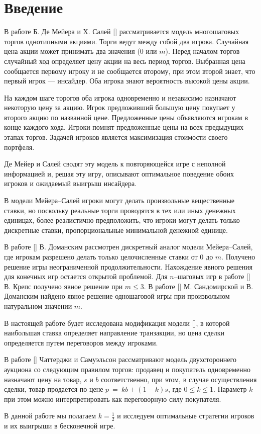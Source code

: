 \section{Введение}
В работе Б. Де Мейера и Х. Салей [\demeyer] рассматривается модель многошаговых торгов однотипными акциями. 
Торги ведут между собой два игрока.
Случайная цена акции может принимать два значения ($ 0 $ или $ m $).
Перед началом торгов случайный ход определяет цену акции на весь период торгов.
Выбранная цена сообщается первому игроку и не сообщается второму, при этом второй знает, что первый игрок --- инсайдер.
Оба игрока знают вероятность высокой цены акции.

На каждом шаге торогов оба игрока одновременно и независимо назначают некоторую цену за акцию.
Игрок предложивший большую цену покупает у второго акцию по названной цене. Предложенные цены объявляются игрокам в конце каждого хода. Игроки помнят предложенные цены на всех предыдущих этапах торгов.
Задачей игроков является максимизация стоимости своего портфеля.

Де Мейер и Салей сводят эту модель к повторяющейся игре с неполной информацией и, решая эту игру, описывают оптимальное поведение обоих игроков и ожидаемый выигрыш инсайдера.

В модели Мейера--Салей игроки могут делать произвольные вещественные ставки, но поскольку реальные торги проводятся в тех или иных денежных единицах, более реалистично предположить, что игроки могут делать только дискретные ставки, пропорциональные минимальной денежной единице.
 
В работе [\domansky] В. Доманским рассмотрен дискретный аналог модели Мейера--Салей, где игрокам разрешено делать только целочисленные ставки от $ 0 $ до $ m $.
Получено решение игры неограниченной продолжительности.
Нахождение явного решения для конечных игр остается открытой проблемой.
Для $ n $--шаговых игр в работе [\kreps] В. Крепс получено явное решение при $ m \leq 3 $. 
В работе [\sandomirskaya] М. Сандомирской и В. Доманским найдено явное решение одношаговой игры при произвольном натуральном значении $ m $.

В настоящей работе будет исследована модификация модели [\domansky], в которой наибольшая ставка определяет направление транзакции, но цена сделки определяется путем переговоров между игроками. 

В работе [\samuelson] Чаттерджи и Самуэльсон рассматривают модель двухстороннего аукциона со следующим правилом торгов: продавец и покупатель одновременно назначают цену на товар, $ s $ и $ b $ соответственно, при этом, в случае осуществления сделки, товар продается по цене $ p~=~kb + (1-k)s $, где $ 0 \leq k \leq 1  $. Параметр $ k $ при этом можно интерпретировать как переговорную силу покупателя. 

В данной работе мы полагаем $ k = \frac{1}{2} $ и исследуем оптимальные стратегии игроков и их выигрыши в бесконечной игре.